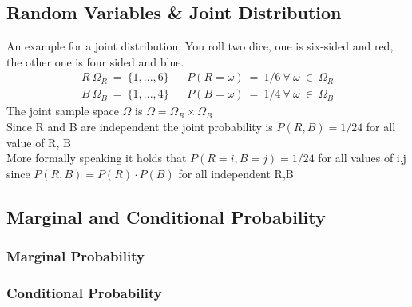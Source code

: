 \subsection{Random Variables \& Joint Distribution}
An example for a joint distribution: You roll two dice, one is six-sided and red, the other one is four sided and blue.
\begin{align}
R~\Omega_R~=~\{1,...,6\} & & P(R=\omega)~=~1/6~\forall~\omega~\in~\Omega_R\\
B~\Omega_B~=~\{1,...,4\} & & P(B=\omega)~=~1/4~\forall~\omega~\in~\Omega_B
\end{align}
The joint sample space $\Omega$ is $\Omega = \Omega_R \times \Omega_B$\\
Since R and B are independent the joint probability is $ P(R,B) = 1/24$ for all value of R, B\\
More formally speaking it holds that $P(R=i, B=j) = 1/24$ for all values of i,j since $P(R,B) = P(R) \cdot P(B)$ for all independent R,B
\subsection{Marginal and Conditional Probability}


\subsubsection*{Marginal Probability}


\subsubsection*{Conditional Probability}